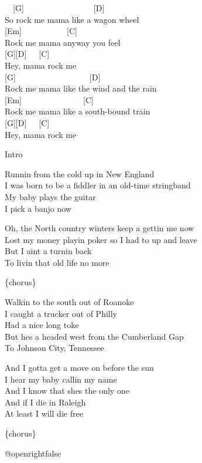 \documentclass[
  letterpaper,
]{scrbook}
\begin{document}
~~{[}G{]}~~~~~~~~~~~~~~~~~{[}D{]}\\
So rock me mama like a wagon wheel\\
{[}Em{]}~~~~~~~~~~~{[}C{]}\\
Rock me mama anyway you feel\\
{[}G{]}{[}D{]}~~~{[}C{]}\\
Hey, mama rock me\\
{[}G{]}~~~~~~~~~~~~~~~~~~{[}D{]}\\
Rock me mama like the wind and the rain\\
{[}Em{]}~~~~~~~~~~~~~~~{[}C{]}\\
Rock me mama like a south-bound train\\
{[}G{]}{[}D{]}~~~{[}C{]}\\
Hey, mama rock me

Intro

Runnin\textquotesingle{} from the cold up in New England\\
I was born to be a fiddler in an old-time stringband\\
My baby plays the guitar\\
I pick a banjo now

Oh, the North country winters keep a gettin\textquotesingle{} me now\\
Lost my money playin\textquotesingle{} poker so I had to up and leave\\
But I ain\textquotesingle t a turnin\textquotesingle{} back\\
To livin\textquotesingle{} that old life no more

\{chorus\}

Walkin\textquotesingle{} to the south out of Roanoke\\
I caught a trucker out of Philly\\
Had a nice long toke\\
But he\textquotesingle s a headed west from the Cumberland Gap\\
To Johnson City, Tennessee

And I gotta get a move on before the sun\\
I hear my baby callin\textquotesingle{} my name\\
And I know that she\textquotesingle s the only one\\
And if I die in Raleigh\\
At least I will die free

\{chorus\}

\csname @openrightfalse\endcsname
\end{document}
